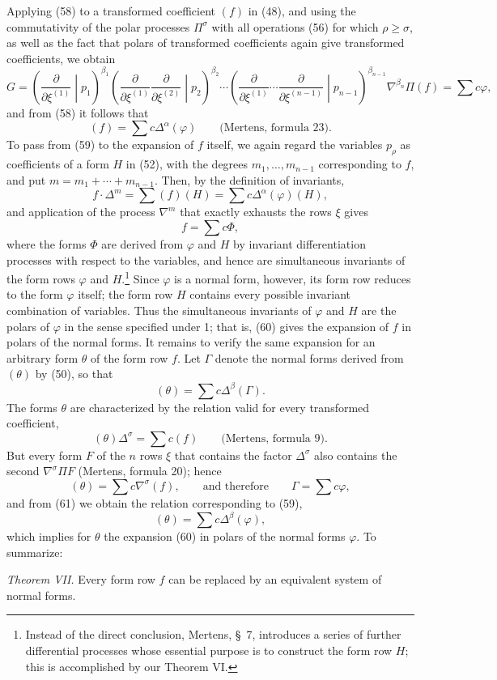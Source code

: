 \documentclass[10pt]{article}
\begin{document}
Applying (58) to a transformed coefficient $(f)$ in (48), and using the
commutativity of the polar processes $\Pi^\sigma$ with all operations (56)
for which $\rho\geq\sigma$, as well as the fact that polars of transformed
coefficients again give transformed coefficients, we obtain
\[
 G=\left(\frac{\partial}{\partial\xi^{(1)}}\middle|p_1\right)^{\beta_1}
 \left(\frac{\partial}{\partial\xi^{(1)}}
 \frac{\partial}{\partial\xi^{(2)}}\middle|p_2\right)^{\beta_2}
 \cdots
 \left(\frac{\partial}{\partial\xi^{(1)}}\cdots
 \frac{\partial}{\partial\xi^{(n-1)}}\middle|p_{n-1}\right)^{\beta_{n-1}}
 \nabla^{\beta_n}\Pi(f)=\sum c\varphi,
\]
and from (58) it follows that
\begin{equation}
 (f)=\sum c\Delta^\alpha(\varphi)
 \qquad\text{(Mertens, formula 23).}
\tag{59}
\end{equation}
To pass from (59) to the expansion of $f$ itself, we again regard the
variables $p_\rho$ as coefficients of a form $H$ in (52), with the degrees
$m_1,\ldots,m_{n-1}$ corresponding to $f$, and put
$m=m_1+\cdots+m_{n-1}$. Then, by the definition of invariants,
\[
 f\cdot\Delta^m=\sum(f)(H)=\sum c\Delta^\alpha(\varphi)(H),
\]
and application of the process $\nabla^m$ that exactly exhausts the rows
$\xi$ gives
\begin{equation}
 f=\sum c\Phi,
\tag{60}
\end{equation}
where the forms $\Phi$ are derived from $\varphi$ and $H$ by invariant
differentiation processes with respect to the variables, and hence are
simultaneous invariants of the form rows $\varphi$ and $H$.\footnote{Instead
of the direct conclusion, Mertens, \S\ 7, introduces a series of further
differential processes whose essential purpose is to construct the form row
$H$; this is accomplished by our Theorem VI.} Since $\varphi$ is a normal
form, however, its form row reduces to the form $\varphi$ itself; the form row
$H$ contains every possible invariant combination of variables. Thus the
simultaneous invariants of $\varphi$ and $H$ are the polars of $\varphi$ in
the sense specified under 1; that is, (60) gives the expansion of $f$ in
polars of the normal forms. It remains to verify the same expansion for an
arbitrary form $\theta$ of the form row $f$. Let $\Gamma$ denote the normal
forms derived from $(\theta)$ by (50), so that
\begin{equation}
 (\theta)=\sum c\Delta^\beta(\Gamma).
\tag{61}
\end{equation}
The forms $\theta$ are characterized by the relation valid for every
transformed coefficient,
\[
 (\theta)\Delta^\sigma=\sum c(f)
 \qquad\text{(Mertens, formula 9).}
\]
But every form $F$ of the $n$ rows $\xi$ that contains the factor
$\Delta^\sigma$ also contains the second $\nabla^\sigma\Pi F$ (Mertens,
formula 20); hence
\[
 (\theta)=\sum c\nabla^\sigma(f),
 \qquad\text{and therefore}\qquad \Gamma=\sum c\varphi,
\]
and from (61) we obtain the relation corresponding to (59),
\[
 (\theta)=\sum c\Delta^\beta(\varphi),
\]
which implies for $\theta$ the expansion (60) in polars of the normal forms
$\varphi$. To summarize:

\emph{Theorem VII.} Every form row $f$ can be replaced by an equivalent
system of normal forms.
\end{document}

